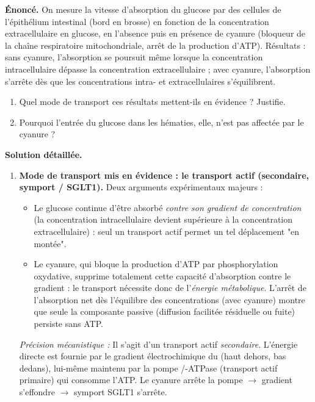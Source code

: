 \documentclass[11pt]{article}
\begin{document}
\begin{exoresolu}
\textbf{Énoncé.} On mesure la vitesse d'absorption du glucose par des cellules de l'épithélium intestinal (bord en brosse) en fonction de la concentration extracellulaire en glucose, en l'absence puis en présence de cyanure (bloqueur de la chaîne respiratoire mitochondriale, arrêt de la production d'ATP). Résultats : sans cyanure, l'absorption se poursuit même lorsque la concentration intracellulaire dépasse la concentration extracellulaire ; avec cyanure, l'absorption s'arrête dès que les concentrations intra- et extracellulaires s'équilibrent.
\begin{enumerate}
\item Quel mode de transport ces résultats mettent-ils en évidence ? Justifie.
\item Pourquoi l'entrée du glucose dans les hématies, elle, n'est pas affectée par le cyanure ?
\end{enumerate}
\tcblower
\textbf{Solution détaillée.}
\begin{enumerate}
\item \textbf{Mode de transport mis en évidence : le transport actif (secondaire, symport / SGLT1).} Deux arguments expérimentaux majeurs :
\begin{itemize}
\item Le glucose continue d'être absorbé \emph{contre son gradient de concentration} (la concentration intracellulaire devient supérieure à la concentration extracellulaire) : seul un transport actif permet un tel déplacement "en montée".
\item Le cyanure, qui bloque la production d'ATP par phosphorylation oxydative, supprime totalement cette capacité d'absorption contre le gradient : le transport nécessite donc de l'\emph{énergie métabolique}. L'arrêt de l'absorption net dès l'équilibre des concentrations (avec cyanure) montre que seule la composante passive (diffusion facilitée résiduelle ou fuite) persiste sans ATP.
\end{itemize}
\textit{Précision mécanistique :} Il s'agit d'un transport actif \emph{secondaire}. L'énergie directe est fournie par le gradient électrochimique du  (haut dehors, bas dedans), lui-même maintenu par la pompe /-ATPase (transport actif primaire) qui consomme l'ATP. Le cyanure arrête la pompe $\to$ gradient  s'effondre $\to$ symport SGLT1 s'arrête.


\end{enumerate}
\end{exoresolu}
\end{document}
